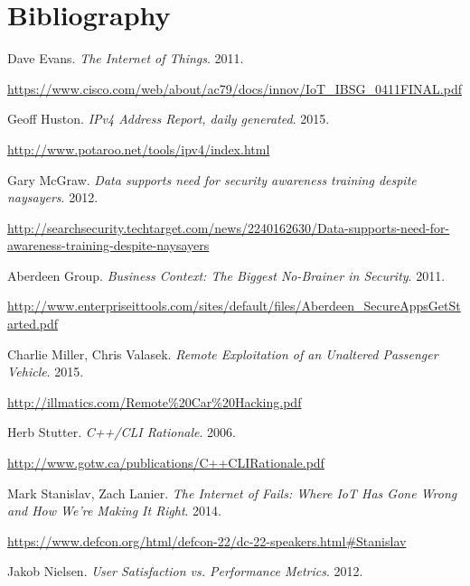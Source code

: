 \documentclass[a4paper,12pt]{article}
\newcommand{\refspace}{\vspace{-2mm}}
\begin{document}
\newpage
\section{Bibliography}

	\begingroup
	\renewcommand{\section}[2]{}
	\begin{thebibliography}{}
		
		Dave Evans. \textit{The Internet of Things}. 2011.
		
		\refspace
		\url{https://www.cisco.com/web/about/ac79/docs/innov/IoT\_IBSG\_0411FINAL.pdf}
		
		Geoff Huston. \textit{IPv4 Address Report, daily generated}. 2015.
		
		\refspace
		\url{http://www.potaroo.net/tools/ipv4/index.html}
		
		Gary McGraw. \textit{Data supports need for security awareness training despite naysayers}. 2012.
		
		\refspace
		\url{http://searchsecurity.techtarget.com/news/2240162630/Data-supports-need-for-awareness-training-despite-naysayers}
		
		Aberdeen Group. \textit{Business Context: The Biggest No-Brainer in Security}. 2011.
		
		\refspace
		\url{http://www.enterpriseittools.com/sites/default/files/Aberdeen_SecureAppsGetStarted.pdf}
		
		Charlie Miller, Chris Valasek. \textit{Remote Exploitation of an Unaltered Passenger Vehicle}. 2015.
		
		\refspace
		\url{http://illmatics.com/Remote\%20Car\%20Hacking.pdf}
		
		Herb Stutter. \textit{C++/CLI Rationale}. 2006.
		
		\refspace
		\url{http://www.gotw.ca/publications/C++CLIRationale.pdf}
		
		Mark Stanislav, Zach Lanier. \textit{The Internet of Fails: Where IoT Has Gone Wrong and How We're Making It Right}. 2014.
		
		\refspace
		\url{https://www.defcon.org/html/defcon-22/dc-22-speakers.html\#Stanislav}
		
		Jakob Nielsen. \textit{User Satisfaction vs. Performance Metrics}. 2012.
		

\end{thebibliography}
\end{document}
